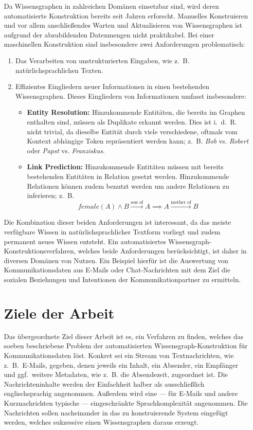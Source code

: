 Da Wissensgraphen in zahlreichen Domänen einsetzbar sind, wird deren automatisierte Konstruktion bereits seit Jahren erforscht.
Manuelles Konstruieren und vor allem anschließendes Warten und Aktualisieren von Wissensgraphen ist aufgrund der abzubildenden Datenmengen nicht praktikabel.
Bei einer maschinellen Konstruktion sind insbesondere zwei Anforderungen problematisch:
\begin{enumerate}
	\item Das Verarbeiten von unstrukturierten Eingaben, wie z.~B. natürlichsprachlichen Texten.
	\item Effizientes Eingliedern neuer Informationen in einen bestehenden Wissensgraphen.
		Dieses Eingliedern von Informationen umfasst insbesondere:
		\begin{itemize}
			\item \textbf{Entity Resolution:}
				Hinzukommende Entitäten, die bereits im Graphen enthalten sind, müssen als Duplikate erkannt werden.
				Dies ist i.~d.~R. nicht trivial, da dieselbe Entität durch viele verschiedene, oftmals vom Kontext abhängige Token repräsentiert werden kann;
				z.~B. \textit{Bob} vs. \textit{Robert} oder \textit{Papst} vs. \textit{Franziskus}.
			\item \textbf{Link Prediction:}
				Hinzukommende Entitäten müssen mit bereits bestehenden Entitäten in Relation gesetzt werden.
				Hinzukommende Relationen können zudem benutzt werden um andere Relationen zu inferieren;
				z.~B. \[\mathit{female}(A) \land B \xrightarrow{\text{son~of}} A \implies A \xrightarrow{\text{mother~of}} B\]
		\end{itemize}
\end{enumerate}

Die Kombination dieser beiden Anforderungen ist interessant, da das meiste verfügbare Wissen in natürlichsprachlicher Textform vorliegt und zudem permanent neues Wissen entsteht.
Ein automatisiertes Wissensgraph-Konstruktionsverfahren, welches beide Anforderungen berücksichtigt, ist daher in diversen Domänen von Nutzen.
Ein Beispiel hierfür ist die Auswertung von Kommunikationsdaten aus E-Mails oder Chat-Nachrichten mit dem Ziel die sozialen Beziehungen und Intentionen der Kommunikationpartner zu ermitteln.

\section{Ziele der Arbeit}%
\label{sec:intro:goals}

Das übergeordnete Ziel dieser Arbeit ist es, ein Verfahren zu finden, welches das soeben beschriebene Problem der automatisierten Wissensgraph-Konstruktion für Kommunikationsdaten löst.
Konkret sei ein Stream von Textnachrichten, wie z.~B.\ E-Mails, gegeben, denen jeweils ein Inhalt, ein Absender, ein Empfänger und ggf.\ weitere Metadaten, wie z.~B. die Absendezeit, zugeordnet ist.
Die Nachrichteninhalte werden der Einfachheit halber als ausschließlich englischsprachig angenommen.
Außerdem wird eine --- für E-Mails und andere Kurznachrichten typische --- eingeschränkte Sprachkomplexität angenommen.
Die Nachrichten sollen nacheinander in das zu konstruierende System eingefügt werden, welches sukzessive einen Wissensgraphen daraus erzeugt.

